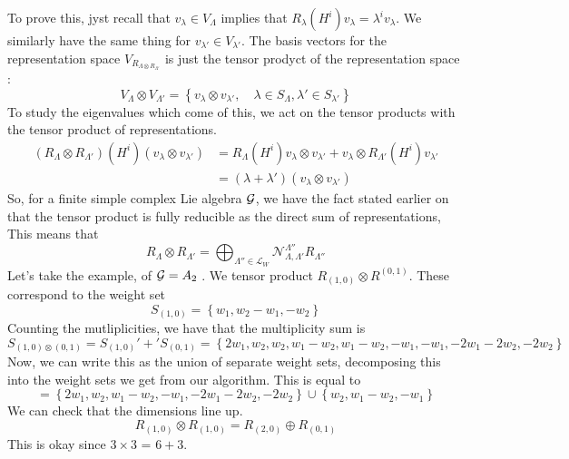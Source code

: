 To prove this, jyst recall that $ v _{ \lambda } \in V_{ \Lambda } $ 
implies that $ R _{ \lambda } \left( H ^ i  \right)  v _ \lambda  = \lambda ^ i v _{ \lambda } $. We similarly have the same thing for $ v _{ \lambda ' } \in V _{ \lambda ' } $. 
The basis vectors for the 
representation space $ V_{ R_{ \Lambda \otimes R _{ \Lambda ' } } } $ 
is just the tensor prodyct of the representation space : 
\[
 V _{ \Lambda } \otimes V _{ \Lambda ' }  = 
 \left\{  v _ \lambda \otimes v _{ \lambda ' } , \quad 
 \lambda \in S _{ \Lambda } , \lambda ' \in S _{ \lambda ' } \right\}  
\] To study the eigenvalues which come 
of this, we act on the tensor products with 
the tensor product of representations. 
\begin{align*}
	\left( R _{ \Lambda } \otimes R _{ \Lambda ' }  \right)  \left( H ^ i  \right)  
	\left( v _{ \lambda } \otimes v _{ \lambda ' }  \right)  &=  
	R _{ \Lambda } \left( H ^ i  \right)  v _{ \lambda } \otimes v _{ \lambda ' } 
	+ v _{ \lambda } \otimes R_{ \Lambda  ' } \left( H ^ i  \right)  v _{ \lambda ' } \\
								 &=  \left( \lambda + \lambda '  \right)  \left( v _{ \lambda  } \otimes v _{\lambda ' }  \right)  
\end{align*}
So, for a finite 
simple complex Lie algebra $ \mathcal{ G } $, 
we have the fact stated earlier on that 
the tensor product is fully reducible as 
the direct sum of representations, 
This means that 
\[
 R _{ \Lambda } \otimes R _{ \Lambda  ' }  = 
 \bigoplus_{ \Lambda '' \in \mathcal{ L } _ W } \mathcal{ N } _{ \Lambda , \Lambda  ' } ^{ \Lambda '' } R _{ \Lambda '' } 
\] Let's take the example, of $ \mathcal{ G }  = A _ 2 $ . 
We tensor product $ R _{ \left( 1, 0  \right)  } \otimes R^{ \left( 0 ,1  \right)  } $. 
These  correspond to the weight set 
\[
	S _{ \left( 1, 0  \right)  }  = \left\{  w _ 1 , w_ 2 - w _ 1 , - w _ 2  \right\}  
\] Counting the mutliplicities, 
we have that the multiplicity sum is 
\[
	S _{ \left( 1, 0  \right)  \otimes \left( 0 , 1  \right)  }  = 
	S_{ \left( 1, 0  \right)  } ' + ' S _{ \left( 0 , 1  \right)  } 
	 = \left\{  2 w _ 1 , w _ 2, w_ 2 , w _ 1 - w _ 2, 
	 w _ 1  - w _ 2 , - w _ 1, - w_ 1 , - 2 w_ 1 - 2 w_ 2 , -  2w _ 2 \right\} 
\] Now, we can write this as the union of 
separate weight sets, decomposing this into 
the weight sets we get from our algorithm. 
This is equal to 
\[
 =  \left\{  2 w_ 1 , w _ 2, w_ 1 - w _ 2, - w_ 1, - 2 w _ 1 - 2 w _ 2,  - 2 w_ 2  \right\}  
 \cup \left\{  w_ 2, w _ 1 - w _ 2 , - w _ 1  \right\} 
\] We can check that the dimensions line up. 
\[
	R_{ \left( 1, 0  \right)  } \otimes R_{ \left( 1, 0  \right)  }  = R _{ \left( 2, 0  \right)  } \oplus R _{ \left( 0 , 1  \right)  }
\] This is okay since $ 3 \times 3 $ = $ 6 + 3 $. 


